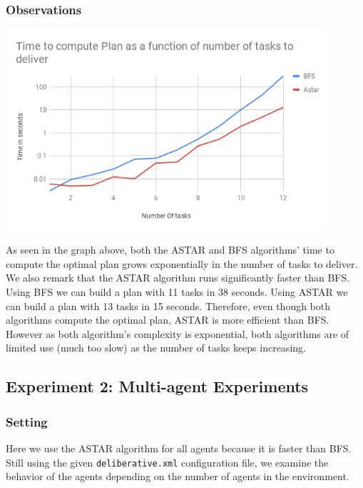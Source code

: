 \documentclass[11pt]{article}
\begin{document}
\subsubsection{Observations}
\begin{center}
\includegraphics[width=12cm]{time.png}
\end{center}
As seen in the graph above, both the ASTAR and BFS algorithms' time to compute the 
optimal plan grows exponentially in the number of tasks to deliver. 
We also remark that the ASTAR algorithm runs significantly faster than BFS. 
Using BFS we can build a plan with 11 tasks in 38 seconds. 
Using ASTAR we can build a plan with 13 tasks in 15 seconds. 
Therefore, even though both algorithms compute the optimal plan, 
ASTAR is more efficient than BFS. However as both algorithm's complexity 
is exponential, both algorithms are of limited use (much too slow) 
as the number of tasks keeps increasing.

\subsection{Experiment 2: Multi-agent Experiments}

\subsubsection{Setting}
Here we use the ASTAR algorithm for all agents because it is faster than 
BFS. Still using the given \texttt{deliberative.xml} configuration file, 
we examine the behavior of the agents depending on the number of agents in the environment.
\end{document}
